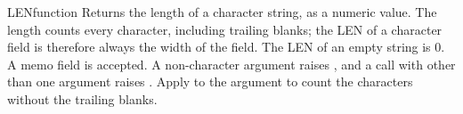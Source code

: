\begin{XbaseEntry}{LEN}{function}
Returns the length of a character string, as a numeric value.
\Syntax
{}
\Usage
The length counts every character, including trailing blanks; the LEN of a character field is therefore always the width of the field. The LEN of an empty string is 0. A memo field is accepted. A non-character argument raises , and a call with other than one argument raises .
\Tips
Apply  to the argument to count the characters without the trailing blanks.
\Examples
{}
\end{XbaseEntry}

